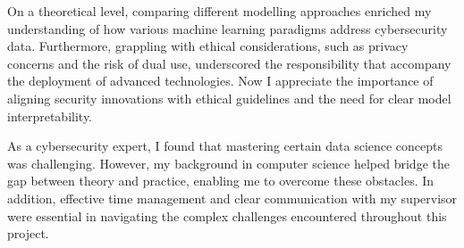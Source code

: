 On a theoretical level, comparing different modelling approaches enriched my understanding of how various machine learning paradigms address cybersecurity data. Furthermore, grappling with ethical considerations, such as privacy concerns and the risk of dual use, underscored the responsibility that accompany the deployment of advanced technologies. Now I appreciate the importance of aligning security innovations with ethical guidelines and the need for clear model interpretability.

As a cybersecurity expert, I found that mastering certain data science concepts was challenging. However, my background in computer science helped bridge the gap between theory and practice, enabling me to overcome these obstacles. In addition, effective time management and clear communication with my supervisor were essential in navigating the complex challenges encountered throughout this project.
